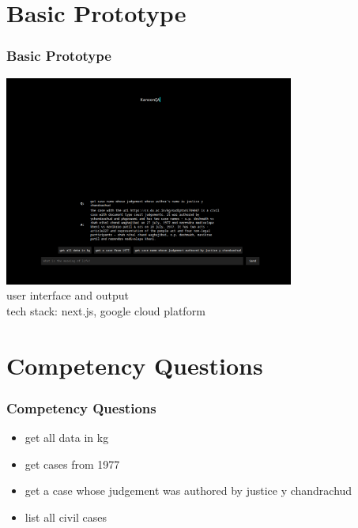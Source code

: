\documentclass[t]{beamer}
\begin{document}
\section{Basic Prototype}
\begin{frame}
    \frametitle{Basic Prototype}

    \centering \includegraphics[width=270pt]{./Screenshot from 2023-03-03 09-34-53.png}\\
   \tiny{user interface and output\\tech stack: next.js, google cloud platform}
\end{frame}

\section{Competency Questions}
\begin{frame}
    \frametitle{Competency Questions}

    \begin{itemize}
        \item get all data in kg
        \item get cases from 1977
        \item get a case whose judgement was authored by justice y chandrachud
        \item list all civil cases
    \end{itemize}
\end{frame}
\end{document}
